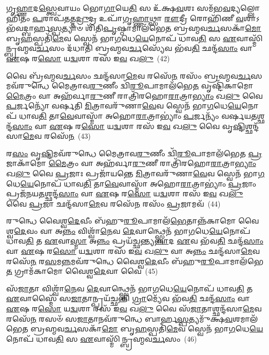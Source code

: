 𑌗𑍃\-\ul{𑌹𑍍𑌣𑌾}\-𑌦\-\ul{𑌸𑍍𑌤𑍍𑌵𑍇}\-𑌵𑌾𑌯𑌂 𑌭𑍋\-\ul{𑌗𑌾}\-𑌯𑍇\-\ul{𑌤𑌿} 𑌸 𑌉᳴𑌕𑍍𑌷\-\ul{𑌵}\-𑌶𑌃 𑌸𑌮᳴𑌭\-\ul{𑌵}\-𑌦𑍍𑌯𑌲𑍍𑌲𑍋𑌹𑌿᳴𑌤𑌂 \ul{𑌪}\-𑌰𑌾𑌪᳴\-\ul{𑌤}\-𑌤𑍍𑌤\-\ul{𑌦𑍍𑌰𑍁}\-𑌦𑍍𑌰 𑌉𑌪𑌾᳴𑌗𑍃\-\ul{𑌹𑍍𑌣𑌾}\-𑌥𑍍𑌸𑌾 \ul{𑌰𑍗}\-𑌦𑍍𑌰𑍀 𑌰𑍋𑌹𑌿᳴𑌣𑍀 \ul{𑌵}\-𑌶𑌾\-𑌽𑌭᳴𑌵\-𑌦𑍍𑌬𑌾𑌰𑍍\mbox{}𑌹\-\ul{𑌸𑍍𑌪}\-𑌤𑍍𑌯𑌾𑍞 𑌶𑌿᳴𑌤𑌿\-\ul{𑌪𑍃}\-𑌷𑍍𑌠𑌾𑌮𑌾𑌲᳴𑌭𑍇𑌤 𑌬𑍍𑌰𑌹𑍍𑌮𑌵\-\ul{𑌰𑍍𑌚}\-𑌸𑌕𑌾᳴\-\ul{𑌮𑍋} 𑌬𑍃\-\ul{𑌹}\-𑌸𑍍𑌪𑌤𑌿᳴\-\ul{𑌮𑍇}\-𑌵 𑌸𑍍𑌵𑍇𑌨᳴ 𑌭𑌾\-\ul{𑌗}\-𑌧𑍇\-\ul{𑌯𑍇}\-𑌨𑍋𑌪᳴ 𑌧𑌾𑌵\-\ul{𑌤𑌿} 𑌸 \ul{𑌏}\-𑌵𑌾𑌸𑍍𑌮𑌿᳴𑌨𑍍𑌬𑍍𑌰𑌹𑍍𑌮\-𑌵\-\ul{𑌰𑍍𑌚}\-𑌸𑌂 𑌦᳴𑌧𑌾𑌤𑌿 𑌬𑍍𑌰𑌹𑍍𑌮𑌵\-\ul{𑌰𑍍𑌚}\-𑌸𑍍𑌯𑍇᳴𑌵 𑌭᳴𑌵\-\ul{𑌤𑌿} 𑌛𑌨𑍍𑌦᳴\-\ul{𑌸𑌾𑌂} 𑌵𑌾 \ul{𑌏}\-𑌷 𑌰\-\ul{𑌸𑍋} 𑌯\-\ul{𑌦𑍍𑌵}\-𑌶𑌾 𑌰𑌸᳴ 𑌇\-\ul{𑌵} 𑌖\-\ul{𑌲𑍁}\-~(42)

𑌵𑍈 𑌬𑍍𑌰᳴𑌹𑍍𑌮𑌵\-\ul{𑌰𑍍𑌚}\-𑌸𑌂 𑌛𑌨𑍍𑌦᳴𑌸𑌾\-\ul{𑌮𑍇}\-𑌵 𑌰𑌸𑍇᳴\-\ul{𑌨} 𑌰𑌸𑌂᳴ 𑌬𑍍𑌰𑌹𑍍𑌮𑌵\-\ul{𑌰𑍍𑌚}\-𑌸𑌮𑌵᳴\-𑌰𑍁𑌨𑍍𑌧𑍇 𑌮𑍈𑌤𑍍𑌰𑌾𑌵\-\ul{𑌰𑍁}\-𑌣𑍀𑌂 𑌦𑍍𑌵𑌿᳴\-\ul{𑌰𑍂}\-𑌪𑌾𑌮𑌾\-𑌲᳴𑌭𑍇\-\ul{𑌤} 𑌵𑍃𑌷𑍍𑌟𑌿᳴𑌕𑌾𑌮𑍋 \ul{𑌮𑍈}\-𑌤𑍍𑌰𑌂 𑌵𑌾 𑌅𑌹᳴𑌰𑍍𑌵𑌾\-\ul{𑌰𑍁}\-𑌣𑍀 𑌰𑌾𑌤𑍍𑌰𑌿᳴𑌰𑌹𑍋\-\ul{𑌰𑌾}\-𑌤𑍍𑌰𑌾\-\ul{𑌭𑍍𑌯𑌾𑌂} 𑌖\-\ul{𑌲𑍁} 𑌵𑍈 \ul{𑌪}\-𑌰𑍍𑌜𑌨𑍍𑌯𑍋᳴ 𑌵𑌰𑍍\mbox{}𑌷𑌤𑌿 \ul{𑌮𑌿}\-𑌤𑍍𑌰𑌾𑌵𑌰𑍁᳴𑌣𑌾\-\ul{𑌵𑍇}\-𑌵 𑌸𑍍𑌵𑍇𑌨᳴ 𑌭𑌾\-\ul{𑌗}\-𑌧𑍇\-\ul{𑌯𑍇}\-𑌨𑍋𑌪᳴ 𑌧𑌾𑌵\-\ul{𑌤𑌿} 𑌤𑌾\-\ul{𑌵𑍇}\-𑌵𑌾𑌸𑍍𑌮𑌾᳴ 𑌅𑌹𑍋\-\ul{𑌰𑌾}\-𑌤𑍍𑌰𑌾\-𑌭𑍍𑌯𑌾𑌂॑ \ul{𑌪}\-𑌰𑍍𑌜𑌨𑍍𑌯𑌂᳴ 𑌵𑌰𑍍\mbox{}𑌷𑌯\-\ul{𑌤}\-𑌶𑍍𑌛𑌨𑍍𑌦᳴\-\ul{𑌸𑌾𑌂} 𑌵𑌾 \ul{𑌏}\-𑌷 𑌰\-\ul{𑌸𑍋} 𑌯\-\ul{𑌦𑍍𑌵}\-𑌶𑌾 𑌰𑌸᳴ 𑌇\-\ul{𑌵} 𑌖\-\ul{𑌲𑍁} 𑌵𑍈 𑌵𑍃\-\ul{𑌷𑍍𑌟𑌿}\-𑌶𑍍𑌛𑌨𑍍𑌦᳴𑌸𑌾\-\ul{𑌮𑍇}\-𑌵 𑌰𑌸𑍇᳴\-\ul{𑌨}\-~(43)

𑌰\-\ul{𑌸𑌂} 𑌵𑍃\-\ul{𑌷𑍍𑌟𑌿}\-𑌮𑌵᳴\-𑌰𑍁𑌨𑍍𑌧𑍇 𑌮𑍈𑌤𑍍𑌰𑌾𑌵\-\ul{𑌰𑍁}\-𑌣𑍀𑌂 𑌦𑍍𑌵𑌿᳴\-\ul{𑌰𑍂}\-𑌪𑌾𑌮𑌾𑌲᳴𑌭𑍇𑌤 \ul{𑌪𑍍𑌰}\-𑌜𑌾𑌕𑌾᳴𑌮𑍋 \ul{𑌮𑍈}\-𑌤𑍍𑌰𑌂 𑌵𑌾 𑌅𑌹᳴𑌰𑍍𑌵𑌾\-\ul{𑌰𑍁}\-𑌣𑍀 𑌰𑌾𑌤𑍍𑌰𑌿᳴𑌰𑌹𑍋\-\ul{𑌰𑌾}\-𑌤𑍍𑌰𑌾\-\ul{𑌭𑍍𑌯𑌾𑌂} 𑌖\-\ul{𑌲𑍁} 𑌵𑍈 \ul{𑌪𑍍𑌰}\-𑌜𑌾𑌃 𑌪𑍍𑌰𑌜𑌾᳴𑌯𑌨𑍍𑌤𑍇 \ul{𑌮𑌿}\-𑌤𑍍𑌰𑌾𑌵𑌰𑍁᳴𑌣𑌾\-\ul{𑌵𑍇}\-𑌵 𑌸𑍍𑌵𑍇𑌨᳴ 𑌭𑌾\-\ul{𑌗}\-𑌧𑍇\-\ul{𑌯𑍇}\-𑌨𑍋𑌪᳴ 𑌧𑌾𑌵\-\ul{𑌤𑌿} 𑌤𑌾\-\ul{𑌵𑍇}\-𑌵𑌾𑌸𑍍𑌮𑌾᳴ 𑌅𑌹𑍋\-\ul{𑌰𑌾}\-𑌤𑍍𑌰𑌾\-𑌭𑍍𑌯𑌾𑌂॑ \ul{𑌪𑍍𑌰}\-𑌜𑌾𑌂 𑌪𑍍𑌰𑌜᳴𑌨𑌯\-\ul{𑌤}\-𑌶𑍍𑌛𑌨𑍍𑌦᳴\-\ul{𑌸𑌾𑌂} 𑌵𑌾 \ul{𑌏}\-𑌷 𑌰\-\ul{𑌸𑍋} 𑌯\-\ul{𑌦𑍍𑌵}\-𑌶𑌾 𑌰𑌸᳴ 𑌇\-\ul{𑌵} 𑌖\-\ul{𑌲𑍁} 𑌵𑍈 \ul{𑌪𑍍𑌰}\-𑌜𑌾 𑌛𑌨𑍍𑌦᳴𑌸𑌾\-\ul{𑌮𑍇}\-𑌵 𑌰𑌸𑍇᳴\-\ul{𑌨} 𑌰𑌸𑌂᳴ \ul{𑌪𑍍𑌰}\-𑌜𑌾𑌮𑌵᳴~(44)

𑌰𑍁𑌨𑍍𑌧𑍇 𑌵𑍈𑌶𑍍𑌵\-\ul{𑌦𑍇}\-𑌵𑍀𑌂 𑌬᳴𑌹𑍁\-\ul{𑌰𑍂}\-𑌪𑌾𑌮𑌾𑌲᳴\-\ul{𑌭𑍇}\-𑌤𑌾𑌨𑍍𑌨᳴𑌕𑌾𑌮𑍋 𑌵𑍈𑌶𑍍𑌵\-\ul{𑌦𑍇}\-𑌵𑌂 𑌵𑌾 𑌅\-\ul{𑌨𑍍𑌨𑌂} 𑌵𑌿𑌶𑍍𑌵𑌾᳴\-\ul{𑌨𑍇}\-𑌵 \ul{𑌦𑍇}\-𑌵𑌾𑌨𑍍𑌥𑍍𑌸𑍍𑌵𑍇𑌨᳴ 𑌭𑌾\-\ul{𑌗}\-𑌧𑍇\-\ul{𑌯𑍇}\-𑌨𑍋𑌪᳴ 𑌧𑌾𑌵\-\ul{𑌤𑌿} 𑌤 \ul{𑌏}\-𑌵𑌾\-\ul{𑌸𑍍𑌮𑌾} 𑌅\-\ul{𑌨𑍍𑌨𑌂} 𑌪𑍍𑌰𑌯᳴𑌚𑍍𑌛𑌨𑍍𑌤𑍍𑌯\-\ul{𑌨𑍍𑌨𑌾}\-𑌦 \ul{𑌏}\-𑌵 𑌭᳴𑌵\-\ul{𑌤𑌿} 𑌛𑌨𑍍𑌦᳴\-\ul{𑌸𑌾𑌂} 𑌵𑌾 \ul{𑌏}\-𑌷 𑌰\-\ul{𑌸𑍋} 𑌯\-\ul{𑌦𑍍𑌵}\-𑌶𑌾 𑌰𑌸᳴ 𑌇\-\ul{𑌵} 𑌖\-\ul{𑌲𑍁} 𑌵𑌾 𑌅\-\ul{𑌨𑍍𑌨𑌂} 𑌛𑌨𑍍𑌦᳴𑌸𑌾\-\ul{𑌮𑍇}\-𑌵 𑌰𑌸𑍇᳴\-\ul{𑌨} 𑌰\-\ul{𑌸}\-𑌮\-\ul{𑌨𑍍𑌨}\-𑌮𑌵᳴\-𑌰𑍁𑌨𑍍𑌧𑍇 𑌵𑍈𑌶𑍍𑌵\-\ul{𑌦𑍇}\-𑌵𑍀𑌂 𑌬᳴𑌹𑍁\-\ul{𑌰𑍂}\-𑌪𑌾𑌮𑌾\-𑌲᳴𑌭𑍇\-\ul{𑌤} 𑌗𑍍𑌰𑌾𑌮᳴𑌕𑌾𑌮𑍋 𑌵𑍈𑌶𑍍𑌵\-\ul{𑌦𑍇}\-𑌵𑌾 𑌵𑍈~(45)

𑌸᳴\-\ul{𑌜𑌾}\-𑌤𑌾 𑌵𑌿𑌶𑍍𑌵𑌾᳴\-\ul{𑌨𑍇}\-𑌵 \ul{𑌦𑍇}\-𑌵𑌾𑌨𑍍𑌥𑍍𑌸𑍍𑌵𑍇𑌨᳴ 𑌭𑌾\-\ul{𑌗}\-𑌧𑍇\-\ul{𑌯𑍇}\-𑌨𑍋𑌪᳴ 𑌧𑌾𑌵\-\ul{𑌤𑌿} 𑌤 \ul{𑌏}\-𑌵𑌾𑌸𑍍𑌮𑍈᳴ 𑌸\-\ul{𑌜𑌾}\-𑌤𑌾𑌨𑍍𑌪𑍍𑌰𑌯᳴𑌚𑍍𑌛𑌨𑍍𑌤𑌿 \ul{𑌗𑍍𑌰𑌾}\-𑌮𑍍𑌯𑍇᳴𑌵 𑌭᳴𑌵\-\ul{𑌤𑌿} 𑌛𑌨𑍍𑌦᳴\-\ul{𑌸𑌾𑌂} 𑌵𑌾 \ul{𑌏}\-𑌷 𑌰\-\ul{𑌸𑍋} 𑌯\-\ul{𑌦𑍍𑌵}\-𑌶𑌾 𑌰𑌸᳴ 𑌇\-\ul{𑌵} 𑌖\-\ul{𑌲𑍁} 𑌵𑍈 𑌸᳴\-\ul{𑌜𑌾}\-𑌤𑌾𑌶𑍍𑌛𑌨𑍍𑌦᳴𑌸𑌾\-\ul{𑌮𑍇}\-𑌵 𑌰𑌸𑍇᳴\-\ul{𑌨} 𑌰𑌸𑍞᳴ 𑌸\-\ul{𑌜𑌾}\-𑌤𑌾𑌨𑌵᳴\-𑌰𑍁𑌨𑍍𑌧𑍇 𑌬𑌾𑌰𑍍\mbox{}𑌹\-\ul{𑌸𑍍𑌪}\-𑌤𑍍𑌯𑌮𑍁᳴𑌕𑍍𑌷\-\ul{𑌵}\-𑌶𑌮𑌾𑌲᳴𑌭𑍇𑌤 𑌬𑍍𑌰𑌹𑍍𑌮𑌵\-\ul{𑌰𑍍𑌚}\-𑌸𑌕𑌾᳴\-\ul{𑌮𑍋} 𑌬𑍃\-\ul{𑌹}\-𑌸𑍍𑌪𑌤𑌿᳴\-\ul{𑌮𑍇}\-𑌵 𑌸𑍍𑌵𑍇𑌨᳴ 𑌭𑌾\-\ul{𑌗}\-𑌧𑍇\-\ul{𑌯𑍇}\-𑌨𑍋𑌪᳴ 𑌧𑌾𑌵\-\ul{𑌤𑌿} 𑌸 \ul{𑌏}\-𑌵𑌾𑌸𑍍𑌮𑌿᳴𑌨𑍍𑌬𑍍𑌰𑌹𑍍𑌮𑌵\-\ul{𑌰𑍍𑌚}\-𑌸𑌂~(46)

